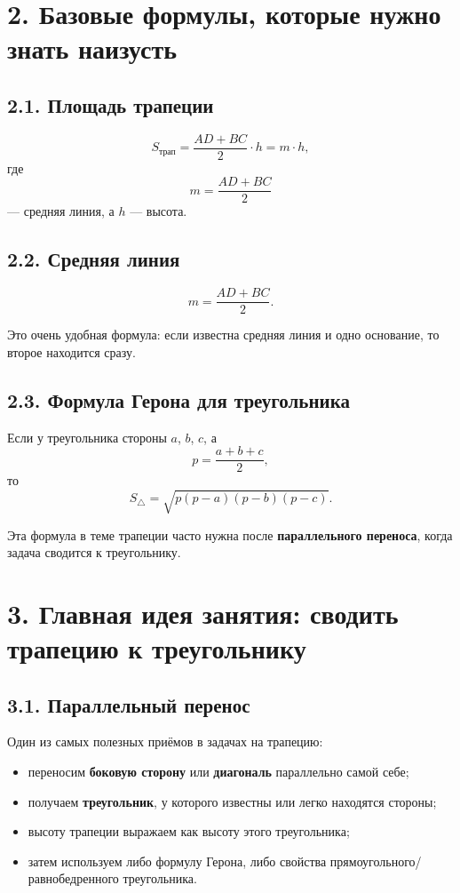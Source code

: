 \documentclass[a4paper,12pt]{article}
\newcommand{\med}{m}
\newcommand{\Area}{S}
\begin{document}
\section*{\textcolor{darkaccent}{2. Базовые формулы, которые нужно знать наизусть}}

\subsection*{\textcolor{accent}{2.1. Площадь трапеции}}
\[
\Area_{\text{трап}}=\frac{AD+BC}{2}\cdot h=\med\cdot h,
\]
где
\[
\med=\frac{AD+BC}{2}
\]
--- средняя линия, а $h$ --- высота.

\subsection*{\textcolor{accent}{2.2. Средняя линия}}
\[
\med=\frac{AD+BC}{2}.
\]

Это очень удобная формула: если известна средняя линия и одно основание, то второе находится сразу.

\subsection*{\textcolor{accent}{2.3. Формула Герона для треугольника}}
Если у треугольника стороны $a$, $b$, $c$, а
\[
p=\frac{a+b+c}{2},
\]
то
\[
\Area_{\triangle}=\sqrt{p(p-a)(p-b)(p-c)}.
\]

Эта формула в теме трапеции часто нужна после \textbf{параллельного переноса}, когда задача сводится к треугольнику.

\section*{\textcolor{darkaccent}{3. Главная идея занятия: сводить трапецию к треугольнику}}

\subsection*{\textcolor{accent}{3.1. Параллельный перенос}}
Один из самых полезных приёмов в задачах на трапецию:

\begin{itemize}
    \item переносим \textbf{боковую сторону} или \textbf{диагональ} параллельно самой себе;
    \item получаем \textbf{треугольник}, у которого известны или легко находятся стороны;
    \item высоту трапеции выражаем как высоту этого треугольника;
    \item затем используем либо формулу Герона, либо свойства прямоугольного/равнобедренного треугольника.
\end{itemize}
\end{document}
